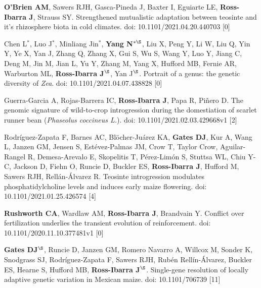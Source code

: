 \documentclass[letterpaper,10pt]{article}
\renewenvironment{itemize}{
  \begin{list}{}{
    \setlength{\leftmargin}{1.5em}
  }
}{
  \end{list}
}
\begin{document}
\begin{itemize}
\item \textbf{O'Brien AM},  Sawers RJH, Gasca-Pineda J, Baxter I, Eguiarte LE, \textbf{Ross-Ibarra J}, Strauss SY.  Strengthened mutualistic adaptation between teosinte and it’s rhizosphere biota in cold climates. doi: 10.1101/2021.04.20.440703
 [0]\\

\item Chen L$^*$, Luo J$^*$, Minliang Jin$^*$, \textbf{Yang N$^{*\S}$}, Liu X, Peng Y, Li W, Liu Q, Yin Y, Ye X, Yan J, Zhang Q, Zhang X, Gui S, Wu S, Wang Y, Luo Y, Jiang C, Deng M, Jin M, Jian L, Yu Y, Zhang M, Yang X, Hufford MB, Fernie AR, Warburton ML, \textbf{Ross-Ibarra J$^\S$}, Yan J$^\S$. Portrait of a genus: the genetic diversity of \textit{Zea}. doi: 10.1101/2021.04.07.438828
 [0]\\


\item Guerra-Garcia A, Rojas-Barrera IC, \textbf{Ross-Ibarra J}, Papa R, Pi\~nero D. The genomic signature of wild-to-crop introgression during the domestiation of scarlet runner bean (\textit{Phaseolus coccineus L.}). doi: 10.1101/2021.02.03.429668v1
 [2]\\

\item Rodr\'iguez-Zapata F, Barnes AC, Bl\"{o}cher-Ju\'arez KA, \textbf{Gates DJ}, Kur A,  Wang L, Janzen GM,  Jensen S, Est\'evez-Palmas JM, Crow T, Taylor Crow, Aguilar-Rangel R, Demesa-Arevalo E, Skopelitis T, P\'erez-Lim\'on S, Stuttsa WL, Chiu Y-C, Jackson D, Fiehn O, Runcie D, Buckler ES, \textbf{Ross-Ibarra J}, Hufford M, Sawers RJH, Rell\'an-\'Alvarez R. Teosinte introgression modulates phosphatidylcholine levels and induces early maize flowering. doi: 10.1101/2021.01.25.426574
 [4]\\

\item \textbf{Rushworth CA},  Wardlaw AM, \textbf{Ross-Ibarra J}, Brandvain Y. Conflict over fertilization underlies the transient evolution of reinforcement. doi: 10.1101/2020.11.10.377481v1
 [0]\\

\item \textbf{Gates DJ}$^\S$, Runcie D, Janzen GM, Romero Navarro A,  Willcox M,  Sonder K, Snodgrass SJ, Rodr\'{i}guez-Zapata F,  Sawers RJH, Rub\'{e}n Rell\'{i}n-\'{A}lvarez, Buckler ES, Hearne S, Hufford MB, \textbf{Ross-Ibarra J}$^\S$. Single-gene resolution of locally adaptive genetic variation in Mexican maize. doi: 10.1101/706739
 [11]\\

\end{itemize}
\end{document}
